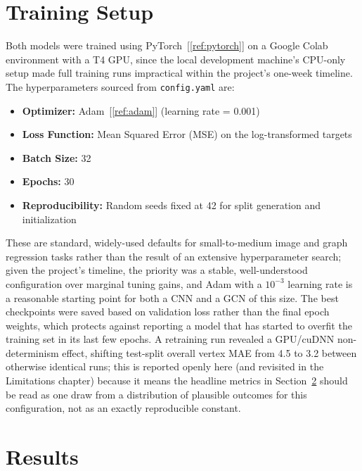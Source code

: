 \documentclass[11pt,letterpaper]{article}
\numberwithin{equation}{section}
\numberwithin{figure}{section}
\numberwithin{table}{section}
\begin{document}
\section{Training Setup}
\label{sec:training}
Both models were trained using PyTorch~[\ref{ref:pytorch}] on a Google Colab environment with a T4 GPU, since the local development machine's CPU-only setup made full training runs impractical within the project's one-week timeline. The hyperparameters sourced from \texttt{config.yaml} are:
\begin{itemize}
    \item \textbf{Optimizer:} Adam~[\ref{ref:adam}] (learning rate = 0.001)
    \item \textbf{Loss Function:} Mean Squared Error (MSE) on the log-transformed targets
    \item \textbf{Batch Size:} 32
    \item \textbf{Epochs:} 30
    \item \textbf{Reproducibility:} Random seeds fixed at 42 for split generation and initialization
\end{itemize}
These are standard, widely-used defaults for small-to-medium image and graph regression tasks rather than the result of an extensive hyperparameter search; given the project's timeline, the priority was a stable, well-understood configuration over marginal tuning gains, and Adam with a $10^{-3}$ learning rate is a reasonable starting point for both a CNN and a GCN of this size. The best checkpoints were saved based on validation loss rather than the final epoch weights, which protects against reporting a model that has started to overfit the training set in its last few epochs. A retraining run revealed a GPU/cuDNN non-determinism effect, shifting test-split overall vertex MAE from 4.5 to 3.2 between otherwise identical runs; this is reported openly here (and revisited in the Limitations chapter) because it means the headline metrics in Section~\ref{sec:results} should be read as one draw from a distribution of plausible outcomes for this configuration, not as an exactly reproducible constant.

\section{Results}
\label{sec:results}
\end{document}
